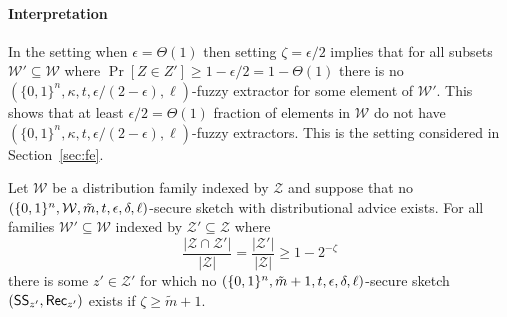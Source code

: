 \paragraph{Interpretation} 
%
In the setting when $\epsilon = \Theta(1)$ then setting $\zeta = \epsilon/2$ implies that for all subsets $\mathcal{W}' \subseteq \mathcal{W}$ where $\Pr[Z\in Z']\ge 1-\epsilon/2 = 1-\Theta(1)$ there is no $(\{0,1\}^n,\kappa, t, \epsilon/(2-\epsilon), \ell)$-fuzzy extractor for some element of $\mathcal{W}'$.  This shows that at least $\epsilon/2=\Theta(1)$ fraction of elements in $\mathcal{W}$ do not have $(\{0,1\}^n,\kappa, t, \epsilon/(2-\epsilon), \ell)$-fuzzy extractors. This is the setting considered in Section~\ref{sec:fe}.


\begin{lemma}
Let $\mathcal{W}$ be a distribution family indexed by $\mathcal{Z}$ and suppose that no $(\{0, 1\}^n, \mathcal{W}, \tilde{m}, t, \epsilon, \delta, \ell)$-secure sketch with distributional advice exists.  For all families $\mathcal{W}'\subseteq \mathcal{W}$ indexed by $\mathcal{Z}'\subseteq \mathcal{Z}$ where\[\frac{|\mathcal{Z}\cap \mathcal{Z}'|}{|\mathcal{Z}|} = \frac{|\mathcal{Z}'|}{|\mathcal{Z}|}\ge 1-2^{-\zeta}\]
there is some $z'\in \mathcal{Z}'$ for which no  $(\{0, 1\}^n, \tilde{m}+1, t, \epsilon, \delta, \ell)$-secure sketch $({\mathsf{SS}}_{z'}, {\mathsf{Rec}}_{z'})$  exists if $\zeta\ge \tilde{m}+1$.
\label{lem:distributional advice suffices ss}
\end{lemma}

